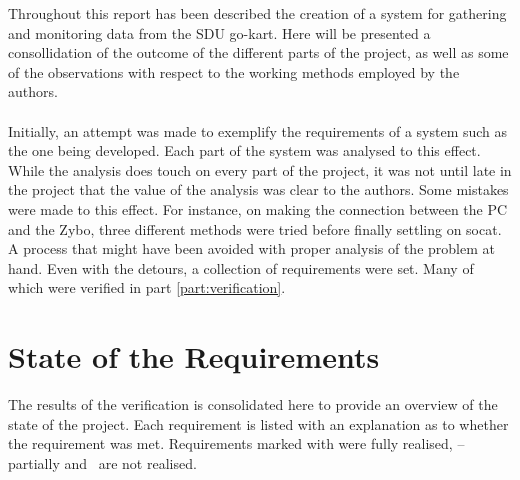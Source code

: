 Throughout this report has been described the creation of a system for gathering and monitoring data from the SDU go-kart.
Here will be presented a consollidation of the outcome of the different parts of the project, as well as some of the observations with respect to the working methods employed by the authors.
\\~\\
Initially, an attempt was made to exemplify the requirements of a system such as the one being developed.
Each part of the system was analysed to this effect.
While the analysis does touch on every part of the project, it was not until late in the project that the value of the analysis was clear to the authors.
Some mistakes were made to this effect. 
For instance, on making the connection between the PC and the Zybo, three different methods were tried before finally settling on socat.
A process that might have been avoided with proper analysis of the problem at hand.
Even with the detours, a collection of requirements were set.
Many of which were verified in part \ref{part:verification}.

\section{State of the Requirements}
The results of the verification is consolidated here to provide an overview of the state of the project.
Each requirement is listed with an explanation as to whether the requirement was met.
Requirements marked with \cmark were fully realised, -- partially and \xmark ~are not realised.

